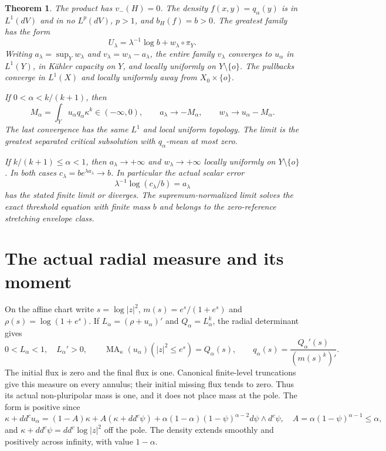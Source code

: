\documentclass[11pt]{article}
\newcommand{\ddc}{dd^c}
\newcommand{\MA}{\operatorname{MA}}
\newtheorem{theorem}{Theorem}
\theoremstyle{remark}\newtheorem{remark}[theorem]{Remark}
\begin{document}
\begin{theorem}\label{thm:selection}
The product has $v_-(H)=0$. The density $f(x,y)=q_\alpha(y)$ is in $L^1(dV)$
and in no $L^p(dV)$, $p>1$, and $b_H(f)=b>0$.
The greatest family has the form
\[
 U_\lambda=\lambda^{-1}\log b+w_\lambda\circ\pi_Y.
\]
Writing $a_\lambda=\sup_Yw_\lambda$ and $v_\lambda=w_\lambda-a_\lambda$,
the entire family $v_\lambda$ converges to $u_\alpha$ in $L^1(Y)$,
in K\"ahler capacity on $Y$, and locally uniformly on $Y\setminus\{o\}$.
The pullbacks converge in $L^1(X)$ and locally uniformly away from
$X_0\times\{o\}$.

If $0<\alpha<k/(k+1)$, then
\[
 M_\alpha=\int_Yu_\alpha q_\alpha\kappa^k\in(-\infty,0),\qquad
 a_\lambda\longrightarrow-M_\alpha,\qquad
 w_\lambda\longrightarrow u_\alpha-M_\alpha.
\]
The last convergence has the same $L^1$ and local uniform topology.
The limit is the greatest separated critical subsolution with
$q_\alpha$-mean at most zero.

If $k/(k+1)\leq\alpha<1$, then $a_\lambda\to+\infty$ and
$w_\lambda\to+\infty$ locally uniformly on $Y\setminus\{o\}$.
In both cases $c_\lambda=b e^{\lambda a_\lambda}\to b$.
In particular the actual scalar error
\[
 \lambda^{-1}\log(c_\lambda/b)=a_\lambda
\]
has the stated finite limit or diverges. The supremum-normalized limit
solves the exact threshold equation with finite mass $b$ and belongs to
the zero-reference stretching envelope class.
\end{theorem}

\section{The actual radial measure and its moment}
On the affine chart write $s=\log|z|^2$,
$m(s)=e^s/(1+e^s)$ and $\rho(s)=\log(1+e^s)$. If
$L_\alpha=(\rho+u_\alpha)'$ and $Q_\alpha=L_\alpha^k$, the radial
determinant gives
\[
 0<L_\alpha<1,\quad L_\alpha'>0,\qquad
 \MA_\kappa(u_\alpha)(|z|^2\leq e^s)=Q_\alpha(s),\qquad
 q_\alpha(s)=\frac{Q_\alpha'(s)}{(m(s)^k)'}.
\]
The initial flux is zero and the final flux is one. Canonical finite-level
truncations give this measure on every annulus; their initial missing
flux tends to zero. Thus its actual non-pluripolar mass is one, and it
does not place mass at the pole. The form is positive since
\[
 \kappa+\ddc u_\alpha
 =(1-A)\kappa+A(\kappa+\ddc\psi)
   +\alpha(1-\alpha)(1-\psi)^{\alpha-2}
                   d\psi\wedge d^c\psi,\quad
 A=\alpha(1-\psi)^{\alpha-1}\leq\alpha,
\]
and $\kappa+\ddc\psi=\ddc\log|z|^2$ off the pole.
The density extends smoothly and positively across infinity, with value
$1-\alpha$.
\end{document}

